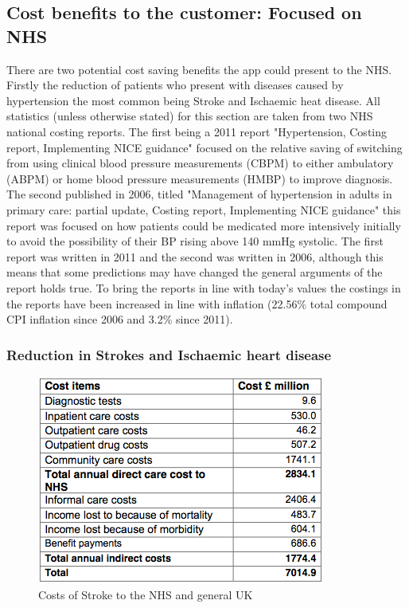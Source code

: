 \documentclass[11pt]{article}
\begin{document}
\subsection{Cost benefits to the customer: Focused on NHS}
There are two potential cost saving benefits the app could present to the NHS. Firstly the reduction of patients who present with diseases caused by hypertension the most common being Stroke and Ischaemic heat disease. All statistics (unless otherwise stated) for this section are taken from two NHS national costing reports. The first being a 2011 report "Hypertension, Costing report, Implementing NICE guidance" \cite{costhome} focused on the relative saving of switching from using clinical blood pressure measurements (CBPM) to either ambulatory (ABPM) or home blood pressure measurements (HMBP) to improve diagnosis. The second published in 2006, titled "Management of hypertension in adults in primary care: partial update, Costing report, Implementing NICE guidance" \cite{costdrug} this report was focused on how patients could be medicated more intensively initially to avoid the possibility of their BP rising above 140 mmHg systolic. The first report was written in 2011 and the second was written in 2006, although this means that some predictions may have changed the general arguments of the report holds true. To bring the reports in line with today's values the costings in the reports have been increased in line with inflation (22.56\% total compound CPI inflation since 2006 and 3.2\% since 2011). 

\subsubsection{Reduction in Strokes and Ischaemic heart disease} 

\begin{figure}
\centering
\includegraphics[scale=0.4]{strokecost.png}
\caption{Costs of Stroke to the NHS and general UK \label{strokecost}} 
\end{figure}
\end{document}
